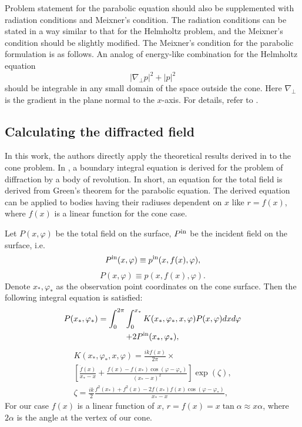 \documentclass{procDDs}
\begin{document}
Problem statement for the parabolic equation should also be supplemented with radiation conditions and Meixner's condition. The radiation conditions can be stated in a way similar to that for the Helmholtz problem, and the Meixner's condition should be slightly modified. The Meixner's condition for the parabolic formulation is as follows. An analog of energy-like combination for the Helmholtz equation 
\begin{equation}
|\nabla_\perp p|^2 + |p|^2
\end{equation}
should be integrable in any small domain of the space outside the cone. Here $\nabla_\perp$ is the gradient in the plane normal to the $x$-axis. For details, refer to \cite{Shanin_parabolic}.

\subsection{Calculating the diffracted field}

In this work, the authors directly apply the theoretical results derived in \cite{Shanin_parabolic} to the cone problem. In \cite{Shanin_parabolic}, a boundary integral equation is derived for the problem of diffraction by a body of revolution. In short, an equation for the total field is derived from Green's theorem for the parabolic equation. The derived equation can be applied to bodies having their radiuses dependent on $x$ like $r = f(x)$, where $f(x)$ is a linear function for the cone case.

Let $P(x,\varphi)$ be the total field on the surface, $P^{\rm in}$ be the incident field on the surface, i.e. 
\begin{equation}
P^{\rm in}(x,\varphi) \equiv p^{\rm in}(x,f(x),\varphi),
\end{equation}
\begin{equation}
P(x,\varphi) \equiv p(x,f(x),\varphi).
\end{equation}
 Denote $x_*, \varphi_*$ as the observation point coordinates on the cone surface. Then the following integral equation is satisfied:
\begin{multline}\label{int_eq} 
P(x_*, \varphi_*) = \int_{0}^{2\pi}\int_{0}^{x_*} K(x_*, \varphi_*, x, \varphi) P(x, \varphi) dx d\varphi \\
+ 2P^{\rm in}(x_*, \varphi_*),
\end{multline}
\begin{multline} \label{int_ker}                   
K(x_*, \varphi_*, x, \varphi) = \frac{ikf(x)}{2\pi} \times \\
\left[ \frac{\dot{f}(x)}{x_* - x} +\frac{f(x) - f(x_*) \cos(\varphi - \varphi_*)}{(x_* - x)^2}\right] \exp(\zeta),\\
\zeta =   \frac{ik}{2} \frac{f^2(x_*) + f^2(x) - 2f(x_*) f(x) \cos(\varphi - \varphi_*)}{x_* - x} ,
\end{multline}
For our case $f(x)$ is a linear function of $x$, $r = f(x) = x\tan\alpha  \approx x \alpha $, where $2\alpha$ is the angle at the vertex of our cone.
\end{document}
